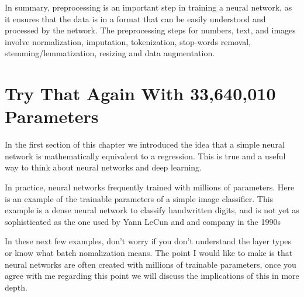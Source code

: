 In summary, preprocessing is an important step in training a neural network, as it ensures that the data is in a format that can be easily understood and processed by the network. The preprocessing steps for numbers, text, and images involve normalization, imputation, tokenization, stop-words removal, stemming/lemmatization, resizing and data augmentation.

\section{Try That Again With 33,640,010 Parameters}

In the first section of this chapter we introduced the idea that a simple neural network is mathematically equivalent to a regression. This is true and a useful way to think about neural networks and deep learning.  

In practice, neural networks frequently trained with millions of parameters. Here is an example of the trainable parameters of a simple image classifier. This example is a dense neural network to classify handwritten digits, and is not yet as sophisticated as the one used by Yann LeCun and and company in the 1990s

In these next few examples, don't worry if you don't understand the layer types or know what batch nomalization means. The point I would like to make is that neural networks are often created with millions of trainable parameters, once you agree with me regarding this point we will discuss the implications of this in more depth.

